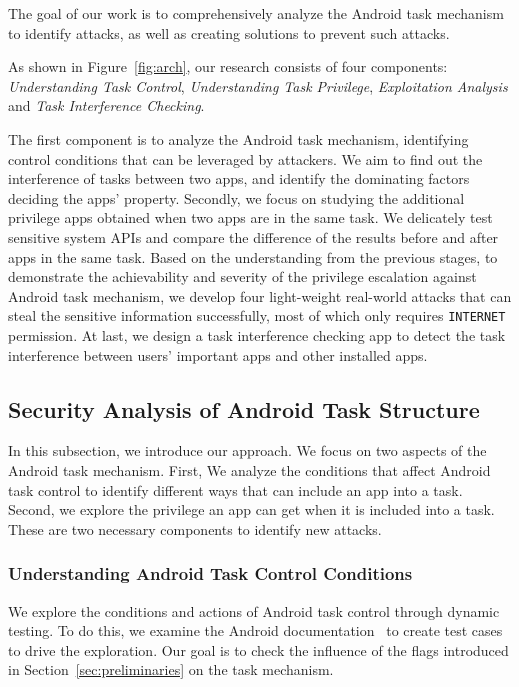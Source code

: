 \documentclass[letterpaper,12pt]{article}
\begin{document}
The goal of our work is to comprehensively analyze the Android task
mechanism to identify attacks, as well as creating solutions to
prevent such attacks.

As shown in Figure~\ref{fig:arch}, our research consists of four
components: \textsl{Understanding Task Control}, \textsl{Understanding
  Task Privilege}, \textsl{Exploitation Analysis} and \textsl{Task
  Interference Checking}.

The first component is to analyze the Android task mechanism,
identifying control conditions that can be leveraged by attackers.
We aim to find out the interference of tasks between two
apps, and identify the dominating factors deciding the apps'
property.  Secondly, we focus on studying the additional privilege
apps obtained when two apps are in the same task. We delicately test sensitive
system APIs and compare the difference of the results before and after
apps in the same task. Based on the understanding from the previous
stages, to demonstrate the achievability and severity of the
privilege escalation against Android task mechanism, we develop four light-weight
real-world attacks that can steal the sensitive information
successfully, most of which only requires \texttt{INTERNET}
permission.  At last, we design a task interference checking app to
detect the task interference between users' important apps and other
installed apps.

\subsection{Security Analysis of Android Task Structure}\label{sec:atmapproach}
In this subsection, we introduce our approach. We focus on two aspects of
the Android task mechanism. First, We analyze the conditions that
affect Android task control to identify different ways that can
include an app into a task. Second, we explore the privilege an app
can get when it is included into a task. These are two necessary
components to identify new attacks.


\subsubsection{Understanding Android Task Control Conditions}

We explore the conditions and actions of Android task control through
dynamic testing.  To do this, we examine the Android
documentation~\cite{taskdoc} to create test cases to drive the
exploration. Our goal is to check the influence of the flags
introduced in Section~\ref{sec:preliminaries} on the task mechanism.
\end{document}
